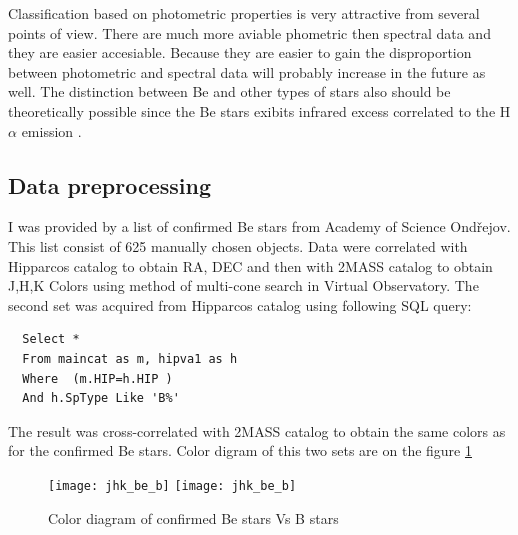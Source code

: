 
Classification based on photometric properties is very attractive from
several points of view. There are much more aviable phometric then
spectral data and they are easier accesiable. Because they are easier
to gain the disproportion between photometric and spectral data will
probably increase in the future as well. The distinction between Be
and other types of stars also should be theoretically possible since
the Be stars exibits infrared excess correlated to the H$\alpha$
emission \cite{van1995halpha}.

\subsection{Data preprocessing}

I was provided by a list of confirmed Be stars from Academy of Science
Ondřejov. This list consist of 625 manually chosen objects. Data were
correlated with Hipparcos \cite{perryman1997hipparcos} catalog to
obtain RA, DEC and then with 2MASS\cite{2006AJ131.1163S} catalog to
obtain J,H,K Colors using method of multi-cone search in Virtual
Observatory. The second set was acquired from Hipparcos catalog using
following SQL query:

\begin{lstlisting}
  Select * 
  From maincat as m, hipva1 as h 
  Where  (m.HIP=h.HIP )  
  And h.SpType Like 'B%'
\end{lstlisting}

The result was cross-correlated with 2MASS catalog to obtain the same
colors as for the confirmed Be stars. Color digram of this two sets
are on the figure \ref{Figjhk_be_b}

    \begin{figure}[!htbp]
      \begin{center}
        \leavevmode
        \ifpdf
        \texttt{[image: jhk\_be\_b]}
        \else
        \texttt{[image: jhk\_be\_b]}
        \fi
        \caption{Color diagram of confirmed Be stars Vs B stars}
        \label{Figjhk_be_b}
      \end{center}
    \end{figure}

